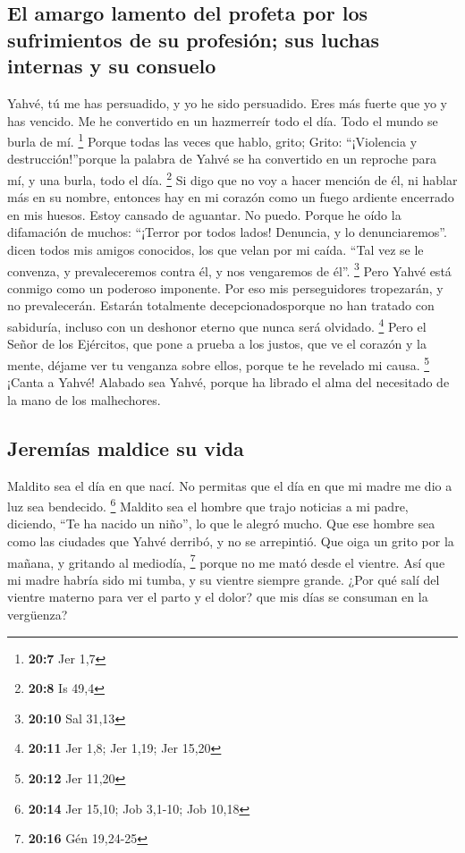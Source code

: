 \begin{paracol}{2}
\hypertarget{el-amargo-lamento-del-profeta-por-los-sufrimientos-de-su-profesiuxf3n-sus-luchas-internas-y-su-consuelo}{%
\subsection{El amargo lamento del profeta por los sufrimientos de su
profesión; sus luchas internas y su
consuelo}\label{el-amargo-lamento-del-profeta-por-los-sufrimientos-de-su-profesiuxf3n-sus-luchas-internas-y-su-consuelo}}

 Yahvé, tú me has persuadido, y yo he sido persuadido.
Eres más fuerte que yo y has vencido. Me he convertido en un hazmerreír
todo el día. Todo el mundo se burla de mí. \footnote{\textbf{20:7} Jer
  1,7}  Porque todas las veces que hablo, grito; Grito:
``¡Violencia y destrucción!''porque la palabra de Yahvé se ha convertido
en un reproche para mí, y una burla, todo el día. \footnote{\textbf{20:8}
  Is 49,4}  Si digo que no voy a hacer mención de él, ni
hablar más en su nombre, entonces hay en mi corazón como un fuego
ardiente encerrado en mis huesos. Estoy cansado de aguantar. No puedo.
 Porque he oído la difamación de muchos: ``¡Terror por
todos lados! Denuncia, y lo denunciaremos''. dicen todos mis amigos
conocidos, los que velan por mi caída. ``Tal vez se le convenza, y
prevaleceremos contra él, y nos vengaremos de él''. \footnote{\textbf{20:10}
  Sal 31,13}  Pero Yahvé está conmigo como un poderoso
imponente. Por eso mis perseguidores tropezarán, y no prevalecerán.
Estarán totalmente decepcionadosporque no han tratado con sabiduría,
incluso con un deshonor eterno que nunca será olvidado. \footnote{\textbf{20:11}
  Jer 1,8; Jer 1,19; Jer 15,20}  Pero el Señor de los
Ejércitos, que pone a prueba a los justos, que ve el corazón y la mente,
déjame ver tu venganza sobre ellos, porque te he revelado mi causa.
\footnote{\textbf{20:12} Jer 11,20}  ¡Canta a Yahvé!
Alabado sea Yahvé, porque ha librado el alma del necesitado de la mano
de los malhechores.

\hypertarget{jeremuxedas-maldice-su-vida}{%
\subsection{Jeremías maldice su
vida}\label{jeremuxedas-maldice-su-vida}}

 Maldito sea el día en que nací. No permitas que el día
en que mi madre me dio a luz sea bendecido. \footnote{\textbf{20:14} Jer
  15,10; Job 3,1-10; Job 10,18}  Maldito sea el hombre
que trajo noticias a mi padre, diciendo, ``Te ha nacido un niño'', lo
que le alegró mucho.  Que ese hombre sea como las
ciudades que Yahvé derribó, y no se arrepintió. Que oiga un grito por la
mañana, y gritando al mediodía, \footnote{\textbf{20:16} Gén 19,24-25}
 porque no me mató desde el vientre. Así que mi madre
habría sido mi tumba, y su vientre siempre grande.  ¿Por
qué salí del vientre materno para ver el parto y el dolor? que mis días
se consuman en la vergüenza?


\end{paracol}
